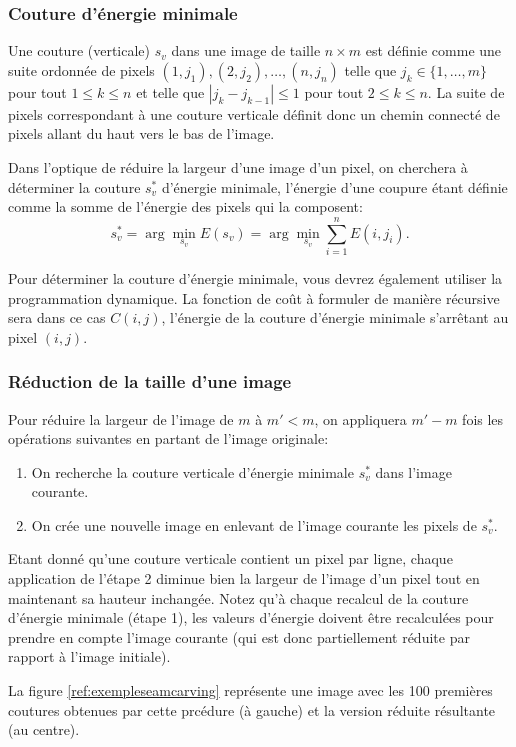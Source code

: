 \documentclass[a4paper,10pt]{article}
\begin{document}
\subsubsection{Couture d'énergie minimale}

Une couture (verticale) $s_v$ dans une image de taille $n\times m$ est
définie comme une suite ordonnée de pixels $(1,j_1),(2,j_2),\ldots,(n,j_n)$
telle que $j_k\in\{1,\ldots,m\}$ pour tout $1\leq k\leq n$ et telle
que $|j_k-j_{k-1}|\leq 1$ pour tout $2\leq k\leq n$. La suite de
pixels correspondant à une couture verticale définit donc un chemin
connecté de pixels allant du haut vers le bas de l'image.

Dans l'optique de réduire la largeur d'une image d'un pixel, on
cherchera à déterminer la couture $s^*_v$ d'énergie minimale, l'énergie d'une
coupure étant définie comme la somme de l'énergie des pixels qui la
composent:
$$s^*_v=\arg\min_{s_v} E(s_v) = \arg\min_{s_v} \sum_{i=1}^n E(i,j_i).$$

Pour déterminer la couture d'énergie minimale, vous devrez également
utiliser la programmation dynamique. La fonction de coût à formuler de
manière récursive sera dans ce cas $C(i,j)$, l'énergie de la couture
d'énergie minimale s'arrêtant au pixel $(i,j)$.


\subsubsection{Réduction de la taille d'une image}\label{sec:reduc}

Pour réduire la largeur de l'image de $m$ à $m'<m$, on appliquera
$m'-m$ fois les opérations suivantes en partant de l'image originale:
\begin{enumerate}
\item On recherche la couture verticale d'énergie minimale $s^*_v$
dans l'image courante.
\item On crée une nouvelle image en enlevant de l'image courante les
pixels de $s^*_v$.
\end{enumerate}
Etant donné qu'une couture verticale contient un pixel par ligne,
chaque application de l'étape 2 diminue bien la largeur de l'image
d'un pixel tout en maintenant sa hauteur inchangée. Notez qu'à chaque
recalcul de la couture d'énergie minimale (étape 1), les valeurs
d'énergie doivent être recalculées pour prendre en compte l'image
courante (qui est donc partiellement réduite par rapport à l'image
initiale).

La figure \ref{ref:exempleseamcarving} représente une image avec les
100 premières coutures obtenues par cette prcédure (à gauche) et la
version réduite résultante (au centre).
\end{document}
